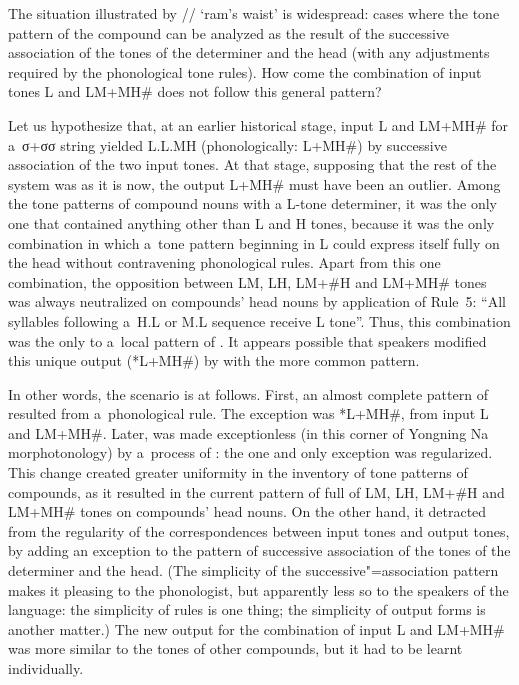 The situation illustrated by // ‘ram’s waist’ is widespread: cases where the tone pattern of the compound can be analyzed as the result of the successive association of the tones of the determiner and the head (with any adjustments required by the phonological tone rules). How come the combination of input tones L and LM+MH\# does not follow this general pattern? 

Let us hypothesize that, at an earlier historical stage, input L and LM+MH\# for a~σ+σσ string yielded L.L.MH (phonologically: L+MH\#) by successive association of the two input tones. At that stage, supposing that the rest of the system was as it is now, the output L+MH\# must have been an outlier. Among the tone patterns of compound nouns with a L-tone determiner, it was the only one that contained anything other than L and H tones, because it was the only combination in which a~tone pattern beginning in L could express itself fully on the head without contravening phonological rules. Apart from this one combination, the opposition between LM, LH, LM+\#H and LM+MH\# tones was always neutralized on compounds' head nouns by application of Rule~5: “All syllables following
a~H.L or M.L sequence receive L tone”. Thus, this combination was the only  to a~local pattern of . It appears possible that speakers modified this unique output (*L+MH\#) by  with the more common pattern. 

In other words, the scenario is at follows. First, an almost complete pattern of  resulted from a~{phonological rule}. The exception was *L+MH\#, from input L and LM+MH\#. Later,  was made exceptionless (in this corner of Yongning Na morphotonology) by a~process of : the one and only exception was regularized. This change created greater uniformity in the inventory of tone patterns of compounds, as it resulted in the current pattern of full  of LM, LH, LM+\#H and LM+MH\# tones on compounds' head nouns. On the other hand, it detracted from the regularity of the correspondences between input tones and output tones, by adding an exception to the pattern of successive association of the tones of the determiner and the head. (The simplicity of the successive"=association pattern makes it pleasing to the phonologist, but apparently less so to the speakers of the language: the simplicity of rules is one thing; the simplicity of output forms is another matter.) The new output for the combination of input L and LM+MH\# was more similar to the tones of other compounds, but it had to be learnt individually.

